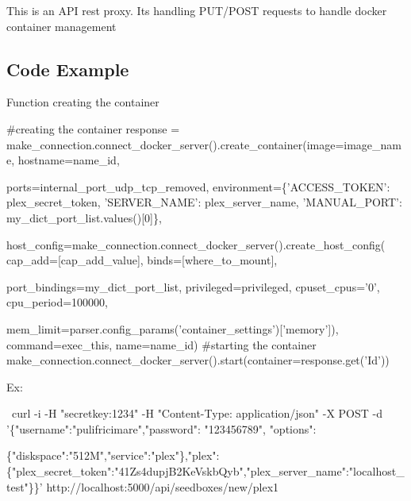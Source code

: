 This is an A\+PI rest proxy. It\textquotesingle{}s handling P\+U\+T/\+P\+O\+ST requests to handle docker container management

\subsection*{Code Example}

Function creating the container


\begin{DoxyCode}
#creating the container
        response = make\_connection.connect\_docker\_server().create\_container(image=image\_name,
       hostname=name\_id,
                                                                           
       ports=internal\_port\_udp\_tcp\_removed,
                                                                            environment=\{'ACCESS\_TOKEN':
       plex\_secret\_token,
                                                                                         'SERVER\_NAME':
       plex\_server\_name,
                                                                                         'MANUAL\_PORT':
       my\_dict\_port\_list.values()[0]\},
                                                                           
       host\_config=make\_connection.connect\_docker\_server().create\_host\_config(
                                                                                cap\_add=[cap\_add\_value],
                                                                                binds=[where\_to\_mount],
                                                                               
       port\_bindings=my\_dict\_port\_list,
                                                                                privileged=privileged,
       cpuset\_cpus='0', cpu\_period=100000,
                                                                               
       mem\_limit=parser.config\_params('container\_settings')['memory']),
                                                                            command=exec\_this,
       name=name\_id)
        #starting the container
        make\_connection.connect\_docker\_server().start(container=response.get('Id'))
\end{DoxyCode}


Ex\+:


\begin{DoxyCode}
~curl -i -H "secretkey:1234" -H "Content-Type: application/json" -X POST -d
       '\{"username":"pulifricimare","password": "123456789", "options": 

      \{"diskspace":"512M","service":"plex"\},"plex":\{"plex\_secret\_token":"41Zs4dupjB2KeVskbQyb","plex\_server\_name":"localhost\_test"\}\}' http://localhost:5000/api/seedboxes/new/plex1
\end{DoxyCode}



